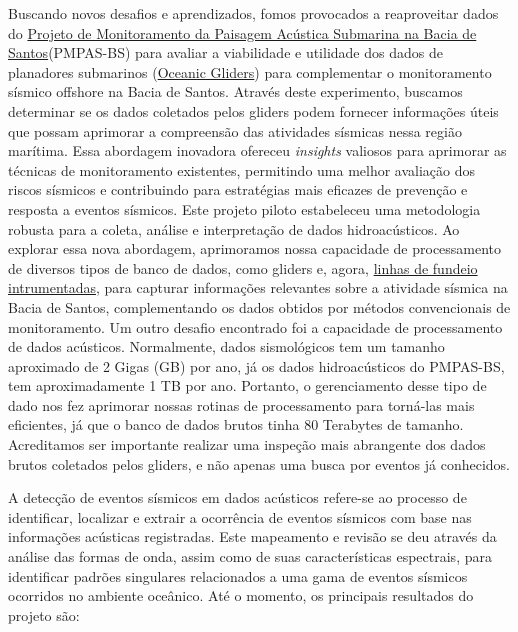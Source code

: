 \documentclass[10pt,a4paper,oneside]{book}
\begin{document}
Buscando novos desafios e aprendizados, fomos provocados a reaproveitar dados do \href{https://comunicabaciadesantos.petrobras.com.br/projeto-de-monitoramento-da-paisagem-acustica-submarina-pmpas-}{Projeto de Monitoramento da Paisagem Acústica Submarina na Bacia de Santos}(PMPAS-BS) para avaliar a viabilidade e utilidade dos dados de planadores submarinos (\href{https://oceanservice.noaa.gov/facts/ocean-gliders.html}{Oceanic Gliders}) para complementar o monitoramento sísmico offshore na Bacia de Santos. Através deste experimento, buscamos determinar se os dados coletados pelos gliders podem fornecer informações úteis que possam aprimorar a compreensão das atividades sísmicas nessa região marítima. Essa abordagem inovadora ofereceu \textit{insights} valiosos para aprimorar as técnicas de monitoramento existentes, permitindo uma melhor avaliação dos riscos sísmicos e contribuindo para estratégias mais eficazes de prevenção e resposta a eventos sísmicos. Este projeto piloto estabeleceu uma metodologia robusta para a coleta, análise e interpretação de dados hidroacústicos. Ao explorar essa nova abordagem, aprimoramos nossa capacidade de processamento de diversos tipos de banco de dados, como gliders e, agora, \href{https://www.io.usp.br/index.php/ocean-coast-res/51-portugues/publicacoes/series-divulgacao/equipamentos-e-tecnologias/819-fundeios-oceanograficos.html}{linhas de fundeio intrumentadas}, para capturar informações relevantes sobre a atividade sísmica na Bacia de Santos, complementando os dados obtidos por métodos convencionais de monitoramento. Um outro desafio encontrado foi a capacidade de processamento de dados acústicos. Normalmente, dados sismológicos tem um tamanho aproximado de 2 Gigas (GB) por ano, já os dados hidroacústicos do PMPAS-BS, tem aproximadamente 1 TB por ano. Portanto, o gerenciamento desse tipo de dado nos fez aprimorar nossas rotinas de processamento para torná-las mais eficientes, já que o banco de dados brutos tinha 80 Terabytes de tamanho. Acreditamos ser importante realizar uma inspeção mais abrangente dos dados brutos coletados pelos gliders, e não apenas uma busca por eventos já conhecidos. 

A detecção de eventos sísmicos em dados acústicos refere-se ao processo de identificar, localizar e extrair a ocorrência de eventos sísmicos com base nas informações acústicas registradas. Este mapeamento e revisão se deu através da análise das formas de onda, assim como de suas características espectrais, para identificar padrões singulares relacionados a uma gama de eventos sísmicos ocorridos no ambiente oceânico. Até o momento, os principais resultados do projeto são:
\end{document}
